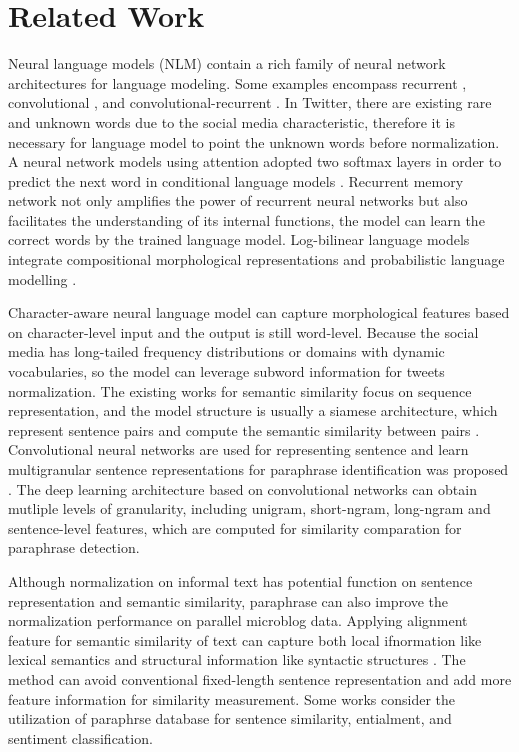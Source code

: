 \documentclass[letterpaper]{article}
\begin{document}
\section{Related Work}
Neural language models (NLM) contain a rich family of neural network architectures for language modeling. Some examples encompass recurrent \cite{mikolov2010recurrent}, convolutional \cite{wang-EtAl:2015:ACL-IJCNLP3}, and convolutional-recurrent \cite{Kim-AAAI1612489}. In Twitter, there are existing rare and unknown words due to the social media characteristic,  therefore it is necessary for language model to point the unknown words before normalization. A neural network models using attention adopted two softmax layers in order to predict the next word in conditional language models \cite{gulcehre-EtAl:2016:P16-1}. Recurrent memory network \cite{tran-bisazza-monz:2016:N16-1} not only amplifies the power of recurrent neural networks but also facilitates the understanding of its internal functions, the model can learn the correct words by the trained language model. Log-bilinear language models integrate compositional morphological representations and probabilistic language modelling \cite{jan-phil:2014:icml}.

Character-aware neural language model \cite{Kim-AAAI1612489} can capture morphological features based on character-level input and the output is still word-level. Because the social media has long-tailed frequency distributions or domains with dynamic vocabularies, so the model can leverage subword information for tweets normalization. The existing works for semantic similarity focus on sequence representation, and the model structure is usually a siamese architecture, which represent sentence pairs and compute the semantic similarity between pairs \cite{jonas-aditya:2016:AAAI}. Convolutional neural networks are used for representing sentence and learn multigranular sentence representations for paraphrase identification was proposed \cite{yin-schutze:2015:NAACL}. The deep learning architecture based on convolutional networks can obtain mutliple levels of granularity, including unigram, short-ngram, long-ngram and sentence-level features, which are computed for similarity comparation for paraphrase detection.

Although normalization on informal text has potential function on sentence representation and semantic similarity, paraphrase can also improve the normalization performance \cite{ling-EtAl:2013:EMNLP} on parallel microblog data. Applying alignment feature for semantic similarity of text can capture both local ifnormation like lexical semantics and structural information like syntactic structures \cite{chen-praveen:2016:ijcai}. The method can avoid conventional fixed-length sentence representation and add more feature information for similarity measurement. Some works \cite{DBLP:journals/corr/WietingBGL15a,pavlick-EtAl:2015:ACL-IJCNLP} consider the utilization of paraphrse database \cite{ganitkevitch-vandurme-callisonburch:2013:NAACL-HLT,pavlick-EtAl:2015:ACL-IJCNLP3}for sentence similarity, entialment, and sentiment classification.
\end{document}
